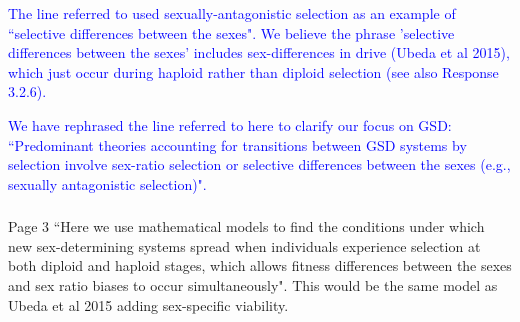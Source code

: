 \documentclass[10pt,letterpaper]{article}
\begin{document}
\textcolor{blue}{
The line referred to used sexually-antagonistic selection as an example of ``selective differences between the sexes". 
We believe the phrase 'selective differences between the sexes' includes sex-differences in drive (Ubeda et al 2015), which just occur during haploid rather than diploid selection (see also Response 3.2.6).
}

\textcolor{blue}{
We have rephrased the line referred to here to clarify our focus on GSD: ``Predominant theories accounting for transitions between GSD systems by selection involve sex-ratio selection or selective differences between the sexes (e.g., sexually antagonistic selection)".
}


\noindent\subsubsection{}
Page 3 ``Here we use mathematical models to find the conditions under which new sex-determining systems spread when individuals experience selection at both diploid and haploid stages, which allows fitness differences between the sexes and sex ratio biases to occur simultaneously".
This would be the same model as Ubeda et al 2015 adding sex-specific viability.
\end{document}
